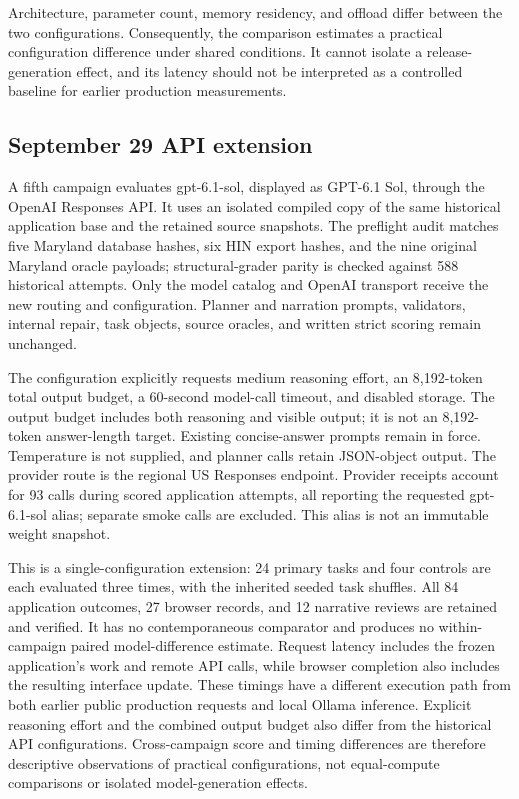 \documentclass[10pt,twocolumn,letterpaper]{article}
\newcommand{\config}[1]{\textsf{#1}}
\begin{document}
Architecture, parameter count, memory residency, and offload differ between the two configurations. Consequently, the comparison estimates a practical configuration difference under shared conditions. It cannot isolate a release-generation effect, and its latency should not be interpreted as a controlled baseline for earlier production measurements.

\subsection{September 29 API extension}
\label{sec:api-extension}
A fifth campaign evaluates \config{gpt-6.1-sol}, displayed as GPT-6.1 Sol, through the OpenAI Responses API. It uses an isolated compiled copy of the same historical application base and the retained source snapshots. The preflight audit matches five Maryland database hashes, six HIN export hashes, and the nine original Maryland oracle payloads; structural-grader parity is checked against 588 historical attempts. Only the model catalog and OpenAI transport receive the new routing and configuration. Planner and narration prompts, validators, internal repair, task objects, source oracles, and written strict scoring remain unchanged.

The configuration explicitly requests medium reasoning effort, an 8,192-token total output budget, a 60-second model-call timeout, and disabled storage. The output budget includes both reasoning and visible output; it is not an 8,192-token answer-length target. Existing concise-answer prompts remain in force. Temperature is not supplied, and planner calls retain JSON-object output. The provider route is the regional US Responses endpoint. Provider receipts account for 93 calls during scored application attempts, all reporting the requested \config{gpt-6.1-sol} alias; separate smoke calls are excluded. This alias is not an immutable weight snapshot.

This is a single-configuration extension: 24 primary tasks and four controls are each evaluated three times, with the inherited seeded task shuffles. All 84 application outcomes, 27 browser records, and 12 narrative reviews are retained and verified. It has no contemporaneous comparator and produces no within-campaign paired model-difference estimate. Request latency includes the frozen application's work and remote API calls, while browser completion also includes the resulting interface update. These timings have a different execution path from both earlier public production requests and local Ollama inference. Explicit reasoning effort and the combined output budget also differ from the historical API configurations. Cross-campaign score and timing differences are therefore descriptive observations of practical configurations, not equal-compute comparisons or isolated model-generation effects.
\end{document}
